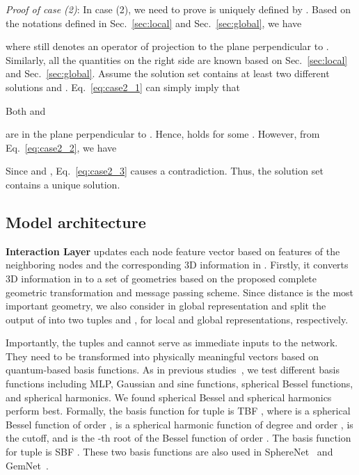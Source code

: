 \documentclass{article}
\begin{document}
\emph{Proof of case (2)}:
In case (2), we need to prove  is uniquely defined by .
Based on the notations defined in Sec.~\ref{sec:local} and Sec.~\ref{sec:global}, we have

where  still denotes an operator of projection to 
the plane perpendicular to .
Similarly, all the quantities on the right side are known based on 
Sec.~\ref{sec:local} and Sec.~\ref{sec:global}. 
Assume the solution set
contains at least two different solutions 
and .
Eq.~\ref{eq:case2_1} can simply imply that



Both  and 

are in the plane perpendicular to .
Hence, 
holds for some .
However, from Eq.~\ref{eq:case2_2}, we have

Since  and , Eq.~\ref{eq:case2_3} causes a contradiction. Thus, the solution set contains a unique solution.




\subsection{Model architecture} \label{sec:model architecture}

\textbf{Interaction Layer} updates each node feature vector  based on features of the neighboring nodes and the corresponding 3D information in . 
Firstly, it converts 3D information in  to a set of geometries
based on the proposed complete geometric transformation  and message passing scheme.
Since distance is the most important geometry, we also consider  in global representation and split the output of  into two tuples  and ,
for local and global representations, respectively.

Importantly, the tuples  and  cannot serve as immediate inputs to the network.
They need to be transformed into physically meaningful vectors based on quantum-based basis functions.
As in previous studies~\cite{hu2021forcenet,klicpera_dimenet_2020,liu2022spherical,klicpera2021gemnet}, we test different basis functions including MLP, Gaussian and sine functions, spherical Bessel functions, and spherical harmonics. We found spherical Bessel and spherical harmonics perform best.
Formally, the basis function for tuple  is TBF ,
where  is a spherical Bessel function of order ,
 is a spherical harmonic function of degree  and order ,
 is the cutoff,
and  is the -th root of the Bessel function of order . 
The basis function for tuple  is SBF .
These two basis functions are also used in SphereNet~\cite{liu2022spherical} and GemNet~\cite{klicpera2021gemnet}.
\end{document}
